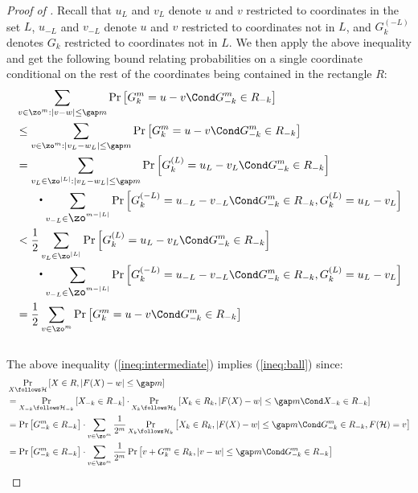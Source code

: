 \begin{proof}[Proof of ]
        Recall that $u_L$ and $v_L$ denote $u$ and $v$ restricted to coordinates in the set $L$, $u_{-L}$ and $v_{-L}$ denote $u$ and $v$ restricted to coordinates not in $L$, and $G_k^{(-L)}$ denotes $G_k$ restricted to coordinates not in $L$. We then apply the above inequality and get the following bound relating probabilities on a single coordinate conditional on the rest of the coordinates being contained in the rectangle $R$:
		\begin{align}
			& \sum_{v\in\zo^m: \left|v-w\right| \le  \gap m }\Pr\left[ G^m_k = u-v \Cond G^m_{-k}\in R_{-k}  \right] \notag\\
			&\le  \sum_{v\in\zo^m: \left|v_L-w_L\right| \le  \gap m }\Pr\left[ G^m_k = u-v \Cond G^m_{-k}\in R_{-k}  \right] \notag\\
			&=  \sum_{v_L\in\zo^{|L|}: \left|v_L-w_L\right| \le  \gap m }\Pr\left[ G^{(L)}_k = u_L-v_L \Cond G^m_{-k}\in R_{-k}  \right] \notag\\
			& \qquad {\Large\boldsymbol{\cdot}} \sum_{v_{-L}\in \zo^{m-|L|}} \Pr\left[ G^{(-L)}_k = u_{-L}-v_{-L} \Cond G^m_{-k}\in R_{-k},G^{(L)}_k = u_L-v_L  \right]  \notag\\
			&<  \frac{1}{2} \sum_{v_L\in\zo^{|L|} }\Pr\left[ G^{(L)}_k = u_L-v_L \Cond G^m_{-k}\in R_{-k}  \right] \notag\\
			& \qquad {\Large\boldsymbol{\cdot}} \sum_{v_{-L}\in \zo^{m-|L|}} \Pr\left[ G^{(-L)}_k = u_{-L}-v_{-L} \Cond G^m_{-k}\in R_{-k},G^{(L)}_k = u_L-v_L  \right]  \notag\\
			&= \frac{1}{2} \sum_{v\in\zo^{m} }\Pr\left[ G^{m}_k = u-v \Cond G^m_{-k}\in R_{-k}  \right] \label{ineq:intermediate}
		\end{align}
		\\
		The above inequality (\ref{ineq:intermediate}) implies (\ref{ineq:ball}) since:
		\begin{align*}
			 & \Pr_{X\follows \mathcal{H}}\left[ X\in R, \left|F(X)-w\right|\le \gap m \right] \\
			&= \Pr_{X_{-k}\follows \mathcal{H}_{-k}}\left[ X_{-k}\in R_{-k} \right]
			\cdot \Pr_{X_k\follows \mathcal{H}_k}\left[ X_k\in R_k, \left|F(X)-w\right|\le \gap m \Cond X_{-k}\in R_{-k}  \right]\\
			&= \Pr\left[ G^m_{-k}\in R_{-k} \right]
			\cdot \sum_{v\in\zo^m}\frac{1}{2^m}\Pr_{X_k\follows \mathcal{H}_k}\left[ X_k\in R_k, \left|F(X)-w\right|\le \gap m \Cond G^m_{-k}\in R_{-k},F(\mathcal{H})=v  \right]\\
			&= \Pr\left[ G^m_{-k}\in R_{-k} \right]
			\cdot \sum_{v\in\zo^m}\frac{1}{2^m}\Pr\left[ v+ G^m_k\in R_k, \left|v-w\right|\le \gap m \Cond G^m_{-k}\in R_{-k}  \right]\\

\end{align*}
\end{proof}
